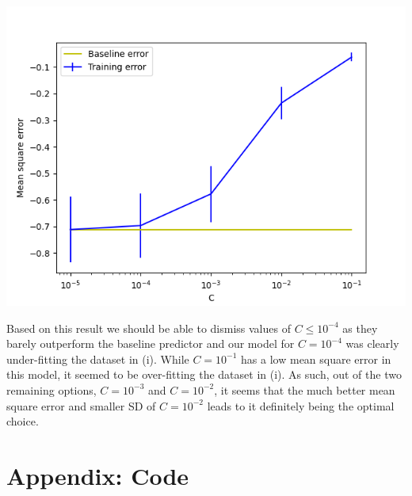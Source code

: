\documentclass[12pt]{article}
\begin{document}
\begin{center}
    \includegraphics[scale=0.65]{fig_12.png}
\end{center}

Based on this result we should be able to dismiss values of $C \leq 10^{-4}$ as they barely outperform the baseline predictor and our model for $C = 10^{-4}$ was clearly under-fitting the dataset in (i). While $C = 10^{-1}$ has a low mean square error in this model, it seemed to be over-fitting the dataset in (i). As such, out of the two remaining options, $C = 10^{-3}$ and $C = 10^{-2}$, it seems that the much better mean square error and smaller SD of $C = 10^{-2}$ leads to it definitely being the optimal choice.

\section*{Appendix: Code}
\end{document}
